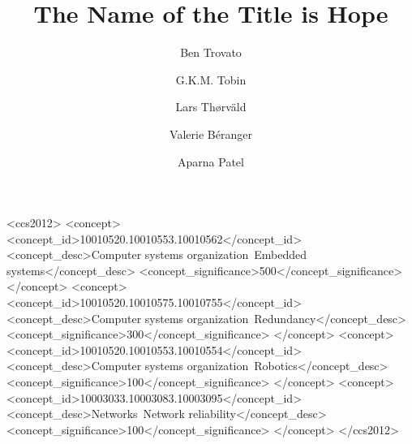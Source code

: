 \documentclass[sigconf]{acmart}
\begin{document}
%
\title{The Name of the Title is Hope}

%
\author{Ben Trovato}
\author{G.K.M. Tobin}
\authornotemark[1]

\author{Lars Th{\o}rv{\"a}ld}

\author{Valerie B\'eranger}

\author{Aparna Patel}


%
\renewcommand{\shortauthors}{Trovato and Tobin, et al.}

%
\begin{abstract}

\end{abstract}

%
%
\begin{CCSXML}
<ccs2012>
 <concept>
  <concept_id>10010520.10010553.10010562</concept_id>
  <concept_desc>Computer systems organization~Embedded systems</concept_desc>
  <concept_significance>500</concept_significance>
 </concept>
 <concept>
  <concept_id>10010520.10010575.10010755</concept_id>
  <concept_desc>Computer systems organization~Redundancy</concept_desc>
  <concept_significance>300</concept_significance>
 </concept>
 <concept>
  <concept_id>10010520.10010553.10010554</concept_id>
  <concept_desc>Computer systems organization~Robotics</concept_desc>
  <concept_significance>100</concept_significance>
 </concept>
 <concept>
  <concept_id>10003033.10003083.10003095</concept_id>
  <concept_desc>Networks~Network reliability</concept_desc>
  <concept_significance>100</concept_significance>
 </concept>
</ccs2012>
\end{CCSXML}
\end{document}
